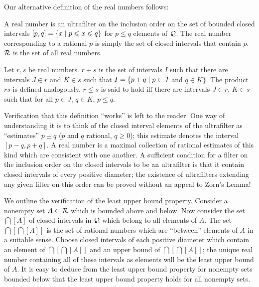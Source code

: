 Our alternative definition of the real numbers follows:

\begin{definition}
 A {\upshape real number} is an ultrafilter on the
 inclusion order on the set of bounded
 closed intervals $[p,q] = \{x \mid p \leqslant x \leqslant q\}$ for $p \leq q$ elements
 of $\cal Q$.  The real number corresponding to a rational $p$ is simply the set of closed intervals that contain $p$. $\cal R$
 is the set of all real numbers.
\end{definition}

\begin{definition}
 Let $r, s$ be real numbers.  $r + s$ is the set of
 intervals $I$ such that there are intervals $J \in r$ and $K \in s$
 such that $I = \{p+q\mid p\in J$ and $q\in K\}$.  The product $rs$ is
 defined analogously.  $r \leq s$ is said to hold iff there are
 intervals $J \in r$, $K \in s$ such that for all $p \in J$, $q \in K$,
 $p \leq q$.
\end{definition}

Verification that this definition ``works'' is left to the reader.
One way of understanding it is to think of the closed interval
elements of the ultrafilter as ``estimates'' $p \pm q$ ($p$ and $q$
rational, $q \geq 0$); this estimate denotes the interval $[p-q,p+q]$.
A real number is a maximal collection of rational estimates
of this kind which are consistent with one another.  A sufficient condition
for a filter on the inclusion order on the closed intervals to
be an ultrafilter is that it contain closed intervals of every positive
diameter; the existence of ultrafilters extending any given filter on
this order can be proved without an appeal to Zorn's Lemma!

We outline the verification of the least upper bound property. 
Consider a nonempty set $A \subset {\cal R}$ which is bounded above
and below.  Now consider the set $\bigcap[A]$ of closed intervals in
$\cal Q$ which belong to all elements of $A$.  The set
$\bigcap[\bigcap[A]]$ is the set of rational numbers
which are ``between'' elements of $A$ in a suitable sense.  Choose closed
intervals of each positive diameter which contain an element of
$\bigcap[\bigcap[A]]$ and an upper bound of $\bigcap[\bigcap[A]]$; the
unique real number containing all of these intervals as elements will
be the least upper bound of $A$.  It is easy to deduce
from the least upper bound property for nonempty sets bounded below that the
least upper bound property holds for all nonempty sets.

